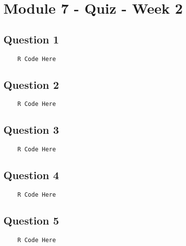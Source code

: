 \documentclass[french]{article}
\begin{document}
\section*{Module 7 - Quiz - Week 2}
\subsection*{Question 1}

\begin{framed}
	\begin{verbatim}
	R Code Here
	\end{verbatim}
\end{framed}
\newpage
\subsection*{Question 2}

\begin{framed}
	\begin{verbatim}
	R Code Here
	\end{verbatim}
\end{framed}
\newpage
\subsection*{Question 3}
\begin{framed}
	\begin{verbatim}
	R Code Here
	\end{verbatim}
\end{framed}
\newpage
\subsection*{Question 4}
\begin{framed}
	\begin{verbatim}
	R Code Here
	\end{verbatim}
\end{framed}
\newpage
\subsection*{Question 5}
\begin{framed}
	\begin{verbatim}
	R Code Here
	\end{verbatim}
\end{framed}
\end{document}
